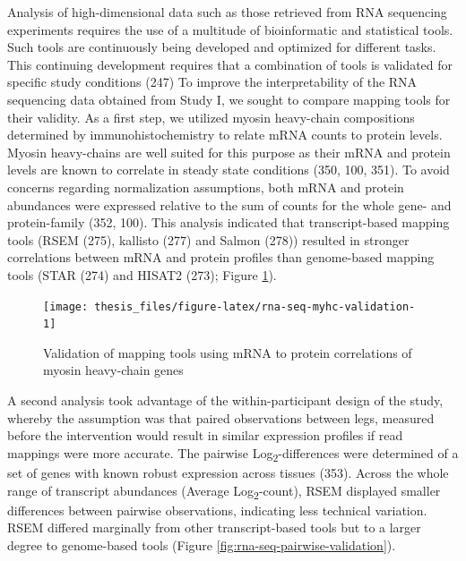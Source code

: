 \documentclass[twoside,10pt]{gihclass} %
\begin{document}
Analysis of high-dimensional data such as those retrieved from RNA sequencing experiments requires the use of a multitude of bioinformatic and statistical tools. Such tools are continuously being developed and optimized for different tasks. This continuing development requires that a combination of tools is validated for specific study conditions (247)
To improve the interpretability of the RNA sequencing data obtained from Study I, we sought to compare mapping tools for their validity. As a first step, we utilized myosin heavy-chain compositions determined by immunohistochemistry to relate mRNA counts to protein levels. Myosin heavy-chains are well suited for this purpose as their mRNA and protein levels are known to correlate in steady state conditions
(350, 100, 351).
To avoid concerns regarding normalization assumptions, both mRNA and protein abundances were expressed relative to the sum of counts for the whole gene- and protein-family
(352, 100).
This analysis indicated that transcript-based mapping tools
(RSEM (275),
kallisto (277) and Salmon (278))
resulted in stronger correlations between mRNA and protein profiles than genome-based mapping tools
(STAR (274)
and HISAT2 (273); Figure \ref{fig:rna-seq-myhc-validation}).
\begin{figure}

{\centering \texttt{[image: thesis\_files/figure-latex/rna-seq-myhc-validation-1]} 

}

\caption[Correlations between gene-family normalized protein and gene data from different mRNA quantification methods.]{Validation of mapping tools using mRNA to protein correlations of myosin heavy-chain genes}\label{fig:rna-seq-myhc-validation}
\end{figure}
A second analysis took advantage of the within-participant design of the study, whereby the assumption was that paired observations between legs, measured before the intervention would result in similar expression profiles if read mappings were more accurate. The pairwise Log\textsubscript{2}-differences were determined of a set of genes with known robust expression across tissues (353).
Across the whole range of transcript abundances (Average Log\textsubscript{2}-count), RSEM displayed smaller differences between pairwise observations, indicating less technical variation. RSEM differed marginally from other transcript-based tools but to a larger degree to genome-based tools (Figure \ref{fig:rna-seq-pairwise-validation}).
\end{document}
